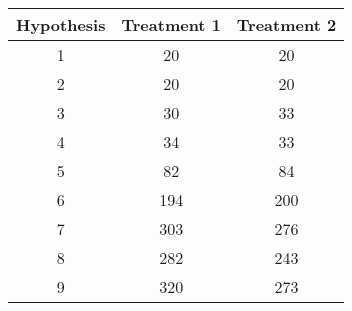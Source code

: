 \begin{tabular}{c|cc}
Hypothesis & Treatment 1 & Treatment 2 \\
\hline
1 & 20 & 20 \\
2 & 20 & 20 \\
3 & 30 & 33 \\
4 & 34 & 33 \\
5 & 82 & 84 \\
6 & 194 & 200 \\
7 & 303 & 276 \\
8 & 282 & 243 \\
9 & 320 & 273 \\
\end{tabular}